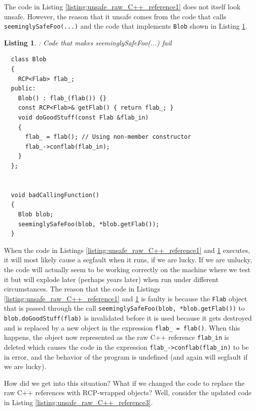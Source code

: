 \documentclass[pdf,ps2pdf,11pt]{SANDreport}
\newtheorem{listing}{Listing}
\begin{document}
The code in Listing {}\ref{listing:unsafe_raw_C++_reference1} does not
itself look unsafe.  However, the reason that it unsafe comes from the
code that calls {}\texttt{seeminglySafeFoo(...)} and the code that
implements {}\texttt{Blob} shown in Listing
{}\ref{listing:unsafe_raw_C++_reference2}.

\begin{listing}: Code that makes seeminglySafeFoo(...) fail\\
\label{listing:unsafe_raw_C++_reference2}
{\small\begin{verbatim}
  class Blob
  {
    RCP<Flab> flab_;
  public:
    Blob() : flab_(flab()) {}
    const RCP<Flab>& getFlab() { return flab_; }
    void doGoodStuff(const Flab &flab_in)
    {
      flab_ = flab(); // Using non-member constructor
      flab_->conflab(flab_in);
    }
  };


  void badCallingFunction()
  {
    Blob blob;
    seeminglySafeFoo(blob, *blob.getFlab());
  }
\end{verbatim}}
\end{listing}

When the code in Listings {}\ref{listing:unsafe_raw_C++_reference1}
and {}\ref{listing:unsafe_raw_C++_reference2} executes, it will most
likely cause a segfault when it runs, if we are lucky.  If we are
unlucky, the code will actually seem to be working correctly on the
machine where we test it but will explode later (perhaps years later)
when run under different circumstances.  The reason that the code in
Listings {}\ref{listing:unsafe_raw_C++_reference1} and
{}\ref{listing:unsafe_raw_C++_reference2} is faulty is because the
{}\texttt{Flab} object that is passed through the call
{}\texttt{seeminglySafeFoo(blob, *blob.getFlab())} to
{}\texttt{blob.doGoodStuff(flab)} is invalidated before it is used
because it gets destroyed and is replaced by a new object in the
expression {}\texttt{flab\_ = flab()}.  When this happens, the object
now represented as the raw C++ reference {}\texttt{flab\_in} is
deleted which causes the code in the expression
{}\texttt{flab\_->conflab(flab\_in)} to be in error, and the behavior
of the program is undefined (and again will segfault if we are lucky).

How did we get into this situation?  What if we changed the code to
replace the raw C++ references with RCP-wrapped objects?  Well,
consider the updated code in Listing
{}\ref{listing:unsafe_raw_C++_reference3}.
\end{document}
